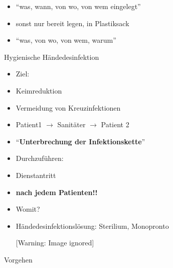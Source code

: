 \documentclass{article}
\newcommand\gEs[1]{\textbf{\textcolor[rgb]{0.0,0.0,0.5019608}{#1}}}
\newcommand\gEs[1]{\textbf{\textcolor[rgb]{0.0,0.0,0.5019608}{#1}}}
\begin{document}
\begin{itemize}
\item {\mdseries
{\textquotedblleft}was, wann, von wo, von wem
eingelegt{\textquotedblright}}

\end{itemize}
\begin{itemize}
\item {\mdseries
sonst nur bereit legen, in Plastiksack}

\end{itemize}
\begin{itemize}
\item {\mdseries
{\textquotedblleft}was, von wo, von wem, warum{\textquotedblright}}

\end{itemize}
{\mdseries\color[rgb]{0.0,0.0,0.5019608}
Hygienische H\"andedesinfektion}

\begin{itemize}
\item {\mdseries
Ziel: }

\end{itemize}
\begin{itemize}
\item {\mdseries
Keimreduktion}

\end{itemize}
\begin{itemize}
\item {\mdseries
Vermeidung von Kreuzinfektionen}

\item {\mdseries
Patient1 ${\rightarrow}$ Sanit\"ater ${\rightarrow}$ Patient 2}

\item {\mdseries
{\textquotedblleft}\gEs{Unterbrechung der
Infektionskette}{\textquotedblright}}

\end{itemize}
\begin{itemize}
\item {\mdseries
Durchzuf\"uhren:}

\end{itemize}
\begin{itemize}
\item {\mdseries
Dienstantritt}

\item {\mdseries
\gEs{nach jedem Patienten!!}}

\end{itemize}
\begin{itemize}
\item {\mdseries
Womit?}

\end{itemize}
\begin{itemize}
\item {\mdseries
H\"andedesinfektionsl\"osung: Sterilium, Monopronto}

\begin{center}
 [Warning: Image ignored] %

\end{center}
\end{itemize}
{\mdseries\color{black}
Vorgehen }
\end{document}
